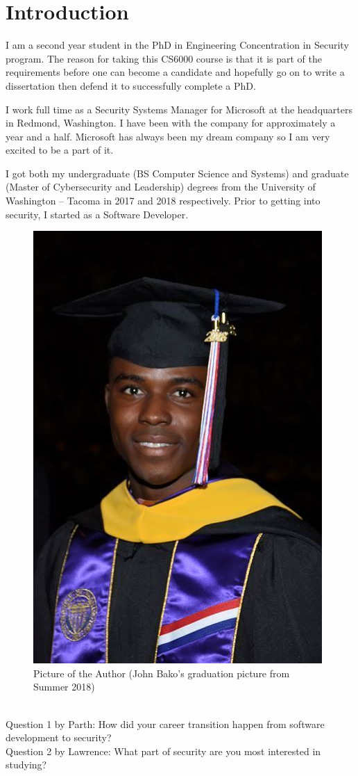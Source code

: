 \section{\large \bf Introduction}

I am a second year student in the PhD in Engineering \– Concentration in Security program. The reason for taking this CS6000 course is that it is part of the requirements before one can become a candidate and hopefully go on to write a dissertation then defend it to successfully complete a PhD.

I work full time as a Security Systems Manager for Microsoft at the headquarters in Redmond, Washington. I have been with the company for approximately a year and a half. Microsoft has always been my dream company so I am very excited to be a part of it.

I got both my undergraduate (BS Computer Science and Systems) and graduate (Master of Cybersecurity and Leadership) degrees from the University of Washington – Tacoma in 2017 and 2018 respectively. Prior to getting into security, I started as a Software Developer.

\begin{figure}
  \includegraphics[width=\linewidth]{jbako.jpg}
  \caption{Picture of the Author (John Bako's graduation picture from Summer 2018)}
\end{figure}

\\
Question 1 by Parth: How did your career transition happen from software development to security? \\

Question 2 by Lawrence: What part of security are you most interested in studying?
